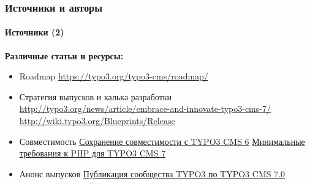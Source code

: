 \begin{frame}[fragile]
	\frametitle{Источники и авторы}
	\framesubtitle{Источники (2)}

	\textbf{Различные статьи и ресурсы:}
		\begin{itemize}\smaller

			\item Roadmap\newline
				\url{https://typo3.org/typo3-cms/roadmap/}
			\item Стратегия выпусков и калька разработки\newline
				\url{http://typo3.org/news/article/embrace-and-innovate-typo3-cms-7/}
				\url{http://wiki.typo3.org/Blueprints/Release}
			\item Совместимость\newline
				\href{http://typo3.org/news/article/retaining-compatibility-to-typo3-cms6/}{Сохранение совместимости с TYPO3 CMS 6}\newline
				\href{http://typo3.org/news/article/php-minimum-requirements-for-typo3-cms-7/}{Минимальные требования к PHP для TYPO3 CMS 7}
			\item Анонс выпусков\newline
				\href{http://typo3.org/news/article/the-typo3-community-publishes-typo3-cms-70-a-new-version-of-its-free-content-management-system/}{Публикация сообщества TYPO3 по TYPO3 CMS 7.0}

		\end{itemize}

\end{frame}


